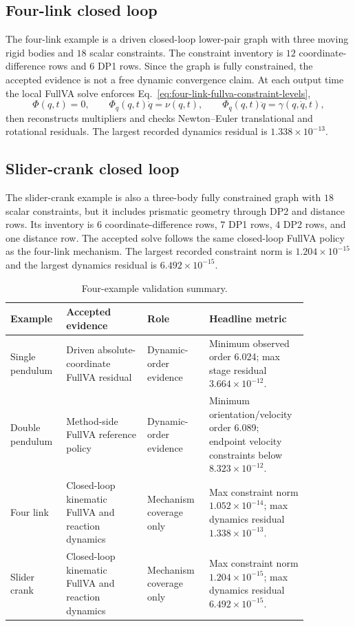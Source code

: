 \documentclass[preprint,12pt]{elsarticle}
\begin{document}
\subsection{Four-link closed loop}

The four-link example is a driven closed-loop lower-pair graph with three
moving rigid bodies and $18$ scalar constraints. The constraint inventory is
$12$ coordinate-difference rows and $6$ DP1 rows. Since the graph is fully
constrained, the accepted evidence is not a free dynamic convergence claim.
At each output time the local FullVA solve enforces
Eq.~\eqref{eq:four-link-fullva-constraint-levels},
\begin{equation}
\label{eq:four-link-fullva-constraint-levels}
  \Phi(q,t)=0,\qquad \Phi_q(q,t)\dot q=\nu(q,t),\qquad
  \Phi_q(q,t)\ddot q=\gamma(q,\dot q,t),
\end{equation}
then reconstructs multipliers and checks Newton--Euler translational and
rotational residuals. The largest recorded dynamics residual is
$1.338\times 10^{-13}$.

\subsection{Slider-crank closed loop}

The slider-crank example is also a three-body fully constrained graph with
$18$ scalar constraints, but it includes prismatic geometry through DP2 and
distance rows. Its inventory is $6$ coordinate-difference rows, $7$ DP1 rows,
$4$ DP2 rows, and one distance row. The accepted solve follows the same
closed-loop FullVA policy as the four-link mechanism. The largest recorded
constraint norm is $1.204\times10^{-15}$ and the largest dynamics residual is
$6.492\times10^{-15}$.

\begin{table}[htbp]
\centering
\small
\setlength{\tabcolsep}{2pt}
\caption{Four-example validation summary.}
\label{tab:asme}
\begin{tabular}{P{0.16\linewidth}P{0.25\linewidth}P{0.19\linewidth}P{0.26\linewidth}}
\toprule
Example & Accepted evidence & Role & Headline metric \\
\midrule
Single pendulum &
Driven absolute-coordinate FullVA residual &
Dynamic-order evidence &
Minimum observed order 6.024; max stage residual
$3.664\times10^{-12}$. \\
Double pendulum &
Method-side FullVA reference policy &
Dynamic-order evidence &
Minimum orientation/velocity order 6.089; endpoint velocity
constraints below $8.323\times10^{-12}$. \\
Four link &
Closed-loop kinematic FullVA and reaction dynamics &
Mechanism coverage only &
Max constraint norm $1.052\times10^{-14}$; max dynamics residual
$1.338\times10^{-13}$. \\
Slider crank &
Closed-loop kinematic FullVA and reaction dynamics &
Mechanism coverage only &
Max constraint norm $1.204\times10^{-15}$; max dynamics residual
$6.492\times10^{-15}$. \\
\bottomrule
\end{tabular}
\end{table}
\end{document}
